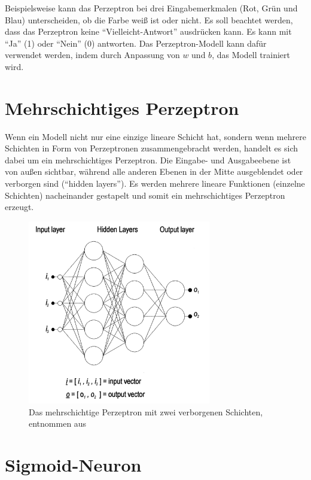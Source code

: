 Beispielsweise kann das Perzeptron bei drei Eingabemerkmalen  (Rot, Grün und Blau) unterscheiden, ob die Farbe weiß ist oder nicht. Es soll beachtet werden, dass das Perzeptron keine \enquote{Vielleicht-Antwort} ausdrücken kann. Es kann mit \enquote{Ja} (1) oder \enquote{Nein} (0) antworten. Das Perzeptron-Modell kann dafür verwendet werden, indem durch Anpassung von $w$ und $b$, das Modell trainiert wird.



\section{Mehrschichtiges Perzeptron}

Wenn ein Modell nicht nur eine einzige lineare Schicht hat, sondern wenn mehrere Schichten in Form von Perzeptronen zusammengebracht werden, handelt es sich dabei um ein mehrschichtiges Perzeptron. Die Eingabe- und Ausgabeebene  ist von außen sichtbar, während alle anderen Ebenen in der Mitte ausgeblendet oder verborgen sind (\enquote{hidden layers}). Es werden mehrere lineare Funktionen (einzelne Schichten) nacheinander gestapelt und somit ein mehrschichtiges Perzeptron erzeugt.

\begin{figure}[H]\label{Kap2:Multi}
    \centering
    \includegraphics[width=8cm]{kapitel2/multilayerperc.png}
    \caption[Das mehrschichtige Perzeptron]{Das mehrschichtige Perzeptron mit zwei verborgenen Schichten, entnommen aus \cite*{Gardner1998}}
    
\end{figure}


\section{Sigmoid-Neuron}

